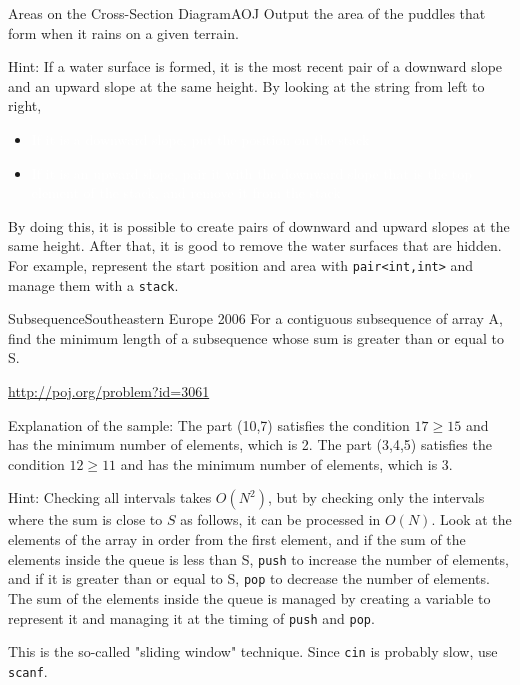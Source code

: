 \begin{pbox}{Areas on the Cross-Section Diagram}{AOJ}
Output the area of the puddles that form when it rains on a given terrain.
  
\end{pbox}

Hint: If a water surface is formed, it is the most recent pair of a downward slope and an upward slope at the same height.
By looking at the string from left to right,
\begin{itemize}
\item \textcolor{white}{If it is a downward slope, put the position on the stack}
\item \textcolor{white}{If it is an upward slope, pair it with the downward slope that is the top element of the stack, and remove it from the stack}
\end{itemize}
By doing this, it is possible to create pairs of downward and upward slopes at the same height. After that, it is good to remove the water surfaces that are hidden. For example, represent the start position and area with \texttt{pair<int,int>} and manage them with a \texttt{stack}.

\begin{pbox}{Subsequence}{Southeastern Europe 2006}
For a contiguous subsequence of array A, find the minimum length of a subsequence whose sum is greater than or equal to S.

\url{http://poj.org/problem?id=3061}
\end{pbox}

Explanation of the sample: The part (10,7) satisfies the condition $17 \ge 15$ and has the minimum number of elements, which is 2.
The part (3,4,5) satisfies the condition $12 \ge 11$ and has the minimum number of elements, which is 3.

Hint: Checking all intervals takes $O(N^2)$, but by checking only the intervals where the sum is close to $S$ as follows, it can be processed in $O(N)$. Look at the elements of the array in order from the first element, and if the sum of the elements inside the queue is less than S, \texttt{push} to increase the number of elements, and if it is greater than or equal to S, \texttt{pop} to decrease the number of elements. The sum of the elements inside the queue is managed by creating a variable to represent it and managing it at the timing of \texttt{push} and \texttt{pop}.

This is the so-called "sliding window" technique. Since \texttt{cin} is probably slow, use \texttt{scanf}.

